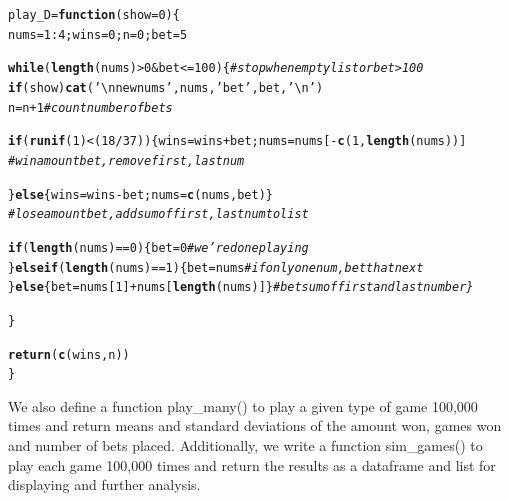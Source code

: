 \documentclass[12pt]{article}\usepackage[]{graphicx}\usepackage[]{color}
\makeatletter
\newcommand{\hlnum}[1]{\textcolor[rgb]{0.686,0.059,0.569}{#1}}%
\newcommand{\hlstr}[1]{\textcolor[rgb]{0.192,0.494,0.8}{#1}}%
\newcommand{\hlcom}[1]{\textcolor[rgb]{0.678,0.584,0.686}{\textit{#1}}}%
\newcommand{\hlopt}[1]{\textcolor[rgb]{0,0,0}{#1}}%
\newcommand{\hlstd}[1]{\textcolor[rgb]{0.345,0.345,0.345}{#1}}%
\newcommand{\hlkwa}[1]{\textcolor[rgb]{0.161,0.373,0.58}{\textbf{#1}}}%
\newcommand{\hlkwb}[1]{\textcolor[rgb]{0.69,0.353,0.396}{#1}}%
\newcommand{\hlkwc}[1]{\textcolor[rgb]{0.333,0.667,0.333}{#1}}%
\newcommand{\hlkwd}[1]{\textcolor[rgb]{0.737,0.353,0.396}{\textbf{#1}}}%
\newenvironment{kframe}{%
 \def\at@end@of@kframe{}%
 \ifinner\ifhmode%
  \def\at@end@of@kframe{\end{minipage}}%
  \begin{minipage}{\columnwidth}%
 \fi\fi%
 \def\FrameCommand##1{\hskip\@totalleftmargin \hskip-\fboxsep
 \colorbox{shadecolor}{##1}\hskip-\fboxsep
     \hskip-\linewidth \hskip-\@totalleftmargin \hskip\columnwidth}%
 \MakeFramed {\advance\hsize-\width
   \@totalleftmargin\z@ \linewidth\hsize
   \@setminipage}}%
 {\par\unskip\endMakeFramed%
 \at@end@of@kframe}
\newenvironment{knitrout}{}{} %
\makeatother
\begin{document}
\begin{knitrout}
\begin{kframe}
\begin{alltt}
\hlstd{play_D} \hlkwb{=} \hlkwa{function}\hlstd{(}\hlkwc{show} \hlstd{=} \hlnum{0}\hlstd{)\{}
  \hlstd{nums}  \hlkwb{=} \hlnum{1}\hlopt{:}\hlnum{4}\hlstd{; wins} \hlkwb{=} \hlnum{0}\hlstd{; n} \hlkwb{=} \hlnum{0}\hlstd{; bet} \hlkwb{=} \hlnum{5}

  \hlkwa{while} \hlstd{(}\hlkwd{length}\hlstd{(nums)} \hlopt{>} \hlnum{0} \hlopt{&} \hlstd{bet} \hlopt{<=} \hlnum{100}\hlstd{)\{} \hlcom{#stop when empty list or bet > 100}
    \hlkwa{if}\hlstd{(show)} \hlkwd{cat}\hlstd{(}\hlstr{'\textbackslash{}nnew nums'}\hlstd{, nums,} \hlstr{'bet'}\hlstd{, bet,} \hlstr{'\textbackslash{}n'}\hlstd{)}
    \hlstd{n} \hlkwb{=} \hlstd{n}\hlopt{+}\hlnum{1} \hlcom{#count number of bets}

    \hlkwa{if}\hlstd{(} \hlkwd{runif}\hlstd{(}\hlnum{1}\hlstd{)} \hlopt{<} \hlstd{(}\hlnum{18}\hlopt{/}\hlnum{37}\hlstd{) )\{ wins} \hlkwb{=} \hlstd{wins}\hlopt{+}\hlstd{bet; nums} \hlkwb{=} \hlstd{nums[}\hlopt{-}\hlkwd{c}\hlstd{(}\hlnum{1}\hlstd{,}\hlkwd{length}\hlstd{(nums))]}
    \hlcom{#win amount bet, remove first, last num}

    \hlstd{\}}\hlkwa{else}\hlstd{\{ wins} \hlkwb{=} \hlstd{wins}\hlopt{-}\hlstd{bet; nums} \hlkwb{=} \hlkwd{c}\hlstd{(nums, bet) \}}
    \hlcom{#lose amount bet, add sum of first, last num to list}

    \hlkwa{if} \hlstd{(}\hlkwd{length}\hlstd{(nums)}\hlopt{==}\hlnum{0}\hlstd{)\{bet} \hlkwb{=} \hlnum{0} \hlcom{#we're done playing}
    \hlstd{\}}\hlkwa{else if} \hlstd{(}\hlkwd{length}\hlstd{(nums)} \hlopt{==} \hlnum{1}\hlstd{)\{bet} \hlkwb{=} \hlstd{nums} \hlcom{#if only one num, bet that next}
    \hlstd{\}}\hlkwa{else}\hlstd{\{bet} \hlkwb{=} \hlstd{nums[}\hlnum{1}\hlstd{]}\hlopt{+}\hlstd{nums[}\hlkwd{length}\hlstd{(nums)]\}} \hlcom{#bet sum of first and last number\}}

  \hlstd{\}}

  \hlkwd{return}\hlstd{(} \hlkwd{c}\hlstd{(wins, n) )}
\hlstd{\}}
\end{alltt}
\end{kframe}
\end{knitrout}

We also define a function play\_many() to play a given type of game 100,000 times and return means and standard deviations of the amount won, games won and number of bets placed. Additionally, we write a function sim\_games() to play each game 100,000 times and return the results as a dataframe and list for displaying and further analysis.
\end{document}
